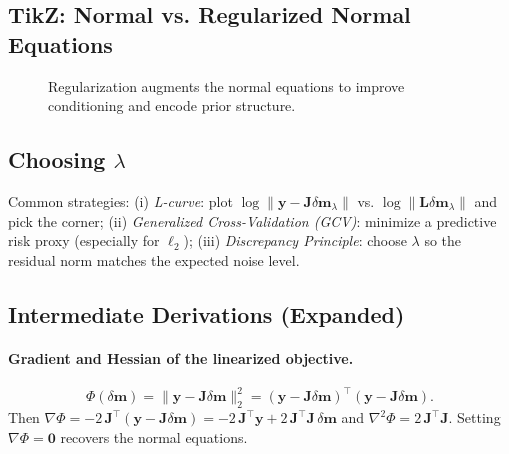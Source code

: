 \documentclass[11pt,a4paper]{article}
\begin{document}
\subsection{TikZ: Normal vs. Regularized Normal Equations}
\begin{figure}[h!]
\centering
{}
\caption{Regularization augments the normal equations to improve conditioning and encode prior structure.}
\end{figure}

\subsection{Choosing \texorpdfstring{$\lambda$}{lambda}}
Common strategies: (i) \emph{L-curve}: plot $\log \|\mathbf{y}-\mathbf{J}\delta\mathbf{m}_\lambda\|$ vs. $\log \|\mathbf{L}\delta\mathbf{m}_\lambda\|$ and pick the corner; (ii) \emph{Generalized Cross-Validation (GCV)}: minimize a predictive risk proxy (especially for $\ell_2$); (iii) \emph{Discrepancy Principle}: choose $\lambda$ so the residual norm matches the expected noise level.

\subsection{Intermediate Derivations (Expanded)}
\paragraph{Gradient and Hessian of the linearized objective.}
\[
\Phi(\delta\mathbf{m}) = \|\mathbf{y}-\mathbf{J}\delta\mathbf{m}\|_2^2
= (\mathbf{y}-\mathbf{J}\delta\mathbf{m})^\top(\mathbf{y}-\mathbf{J}\delta\mathbf{m}).
\]
Then $\nabla \Phi = -2\,\mathbf{J}^\top (\mathbf{y}-\mathbf{J}\delta\mathbf{m}) = -2\,\mathbf{J}^\top \mathbf{y} + 2\,\mathbf{J}^\top\mathbf{J}\,\delta\mathbf{m}$ and $\nabla^2 \Phi = 2\,\mathbf{J}^\top \mathbf{J}$. Setting $\nabla\Phi=\mathbf{0}$ recovers the normal equations.
\end{document}
